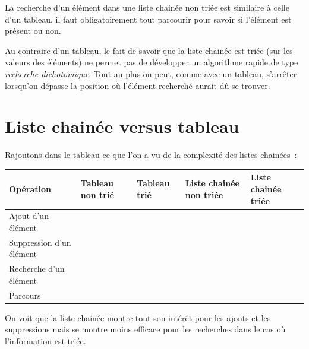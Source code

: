 	La recherche d'un élément dans une liste chainée non triée 
	est similaire à celle d'un tableau, il faut obligatoirement
	tout parcourir pour savoir si l'élément est présent ou non.

	Au contraire d'un tableau, le fait de savoir que la liste chainée 
	est triée (sur les valeurs des éléments) ne permet pas
	de développer un algorithme rapide de type \textit{recherche dichotomique}. 
	Tout au plus on peut, comme avec un tableau, s'arrêter lorsqu'on 
	dépasse la position où l'élément recherché aurait dû se trouver.


\section{Liste chainée versus tableau}

	Rajoutons dans le tableau ce que l'on a vu 
	de la complexité des listes chainées~:

	\begin{center}
		\tablefirsthead{}
		\tablehead{}
		\tabletail{}
		\tablelasttail{}
		\begin{supertabular}{|m{5.145cm}|m{2.023cm}|m{1.7329999cm}|m{2.836cm}|m{2.675cm}|}
		\hline
		{\bfseries Opération} &
		{\bfseries Tableau non trié} &
		{\bfseries Tableau trié} &
		{\bfseries Liste chainée non triée} &
		{\bfseries Liste chainée triée}\\
		\hline
		{Ajout d'un élément} &
		 &
		 &
		 &
		\centering{}\\
		\hline
		{Suppression d'un élément} &
		 &
		 &
		 &
		\centering{}\\
		\hline
		{Recherche d'un élément} &
		 &
		 &
		 &
		\centering{}\\
		\hline
		{Parcours} &
		 &
		 &
		 &
		\centering{}\\
		\hline
		\end{supertabular}
	\end{center}
	
	On voit que la liste chainée montre tout son intérêt pour les ajouts 
	et les suppressions mais se montre moins efficace
	pour les recherches dans le cas où l'information est triée.


